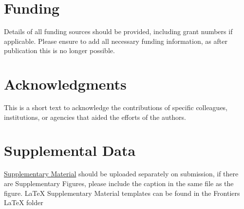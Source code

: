 \documentclass[utf8]{frontiersSCNS} %
\begin{document}
\section*{Funding}
Details of all funding sources should be provided, including grant numbers if applicable. Please ensure to add all necessary funding information, as after publication this is no longer possible.

\section*{Acknowledgments}
This is a short text to acknowledge the contributions of specific colleagues, institutions, or agencies that aided the efforts of the authors.

\section*{Supplemental Data}
 \href{http://home.frontiersin.org/about/author-guidelines#SupplementaryMaterial}{Supplementary Material} should be uploaded separately on submission, if there are Supplementary Figures, please include the caption in the same file as the figure. LaTeX Supplementary Material templates can be found in the Frontiers LaTeX folder 




\end{document}
